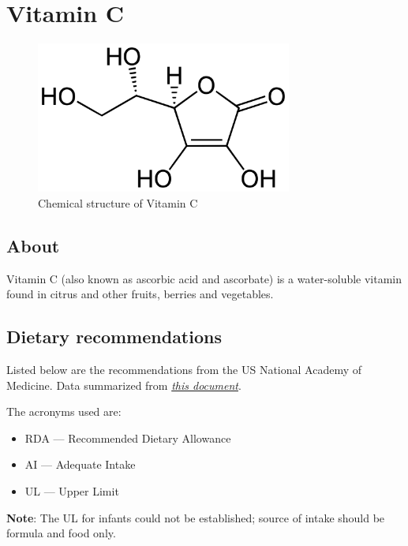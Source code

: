 \documentclass{book}
\begin{document}
\begin{sloppypar}
\chapter{Vitamin C}
\begin{figure}[h]
	\caption{Chemical structure of Vitamin C}
	\centering \includegraphics[width=0.75\textwidth]{images/Vitamin_C_chemical_structure}
\end{figure}
\newpage

\section{About}
Vitamin C (also known as ascorbic acid and ascorbate) is a water-soluble vitamin found in citrus and other fruits, berries and vegetables.

\section{Dietary recommendations}
Listed below are the recommendations from the US National Academy of Medicine. Data summarized from \href{https://nap.nationalacademies.org/read/9810/chapter/7}{\textit{this document}}.

The acronyms used are:
\begin{itemize}
	\item RDA --- Recommended Dietary Allowance
	\item AI --- Adequate Intake
	\item UL --- Upper Limit
\end{itemize}

\textbf{Note}: The UL for infants could not be established; source of intake should be formula and food only.


\end{sloppypar}
\end{document}
